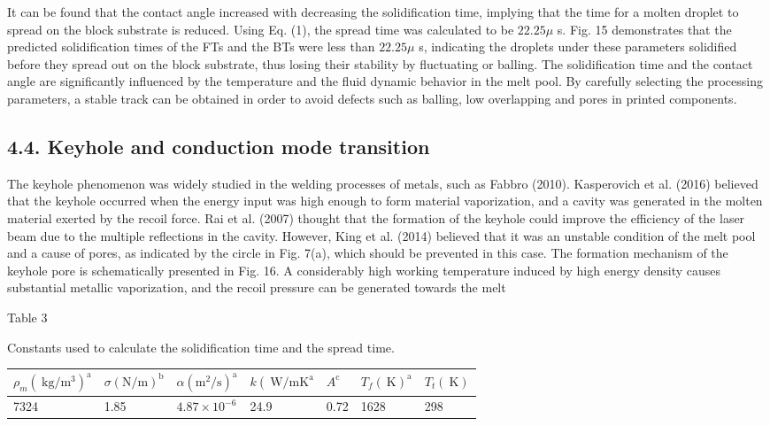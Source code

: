 \documentclass[10pt]{article}
\begin{document}
It can be found that the contact angle increased with decreasing the solidification time, implying that the time for a molten droplet to spread on the block substrate is reduced. Using Eq. (1), the spread time was calculated to be $22.25 \mu$ s. Fig. 15 demonstrates that the predicted solidification times of the FTs and the BTs were less than $22.25 \mu$ s, indicating the droplets under these parameters solidified before they spread out on the block substrate, thus losing their stability by fluctuating or balling. The solidification time and the contact angle are significantly influenced by the temperature and the fluid dynamic behavior in the melt pool. By carefully selecting the processing parameters, a stable track can be obtained in order to avoid defects such as balling, low overlapping and pores in printed components.

\subsection*{4.4. Keyhole and conduction mode transition}
The keyhole phenomenon was widely studied in the welding processes of metals, such as Fabbro (2010). Kasperovich et al. (2016) believed that the keyhole occurred when the energy input was high enough to form material vaporization, and a cavity was generated in the molten material exerted by the recoil force. Rai et al. (2007) thought that the formation of the keyhole could improve the efficiency of the laser beam due to the multiple reflections in the cavity. However, King et al. (2014) believed that it was an unstable condition of the melt pool and a cause of pores, as indicated by the circle in Fig. 7(a), which should be prevented in this case. The formation mechanism of the keyhole pore is schematically presented in Fig. 16. A considerably high working temperature induced by high energy density causes substantial metallic vaporization, and the recoil pressure can be generated towards the melt

Table 3

Constants used to calculate the solidification time and the spread time.

\begin{center}
\begin{tabular}{lllllll}
\hline
$\rho_{m}\left(\mathrm{~kg} / \mathrm{m}^{3}\right)^{\mathrm{a}}$ & $\sigma(\mathrm{N} / \mathrm{m})^{\mathrm{b}}$ & $\alpha\left(\mathrm{m}^{2} / \mathrm{s}\right)^{\mathrm{a}}$ & $k\left(\mathrm{~W} / \mathrm{m} \mathrm{K}^{\mathrm{a}}\right.$ & $A^{\mathrm{c}}$ & $T_{f}(\mathrm{~K})^{\mathrm{a}}$ & $T_{t}(\mathrm{~K})$ \\
\hline
7324 & 1.85 & $4.87 \times 10^{-6}$ & 24.9 & 0.72 & 1628 & 298 \\
\hline
\end{tabular}
\end{center}
\end{document}
